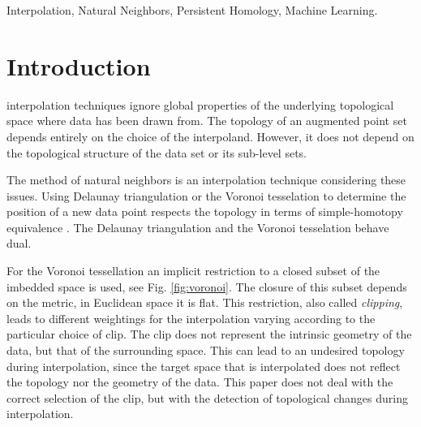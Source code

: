 \documentclass[journal]{IEEEtran}
\begin{document}
\begin{IEEEkeywords}
Interpolation, Natural Neighbors, Persistent Homology, Machine Learning.
\end{IEEEkeywords}


%
\IEEEpeerreviewmaketitle



\section{Introduction}
%
%
%
%
 interpolation techniques ignore global properties of the underlying topological space where data has been drawn from. The topology of an augmented point set depends entirely on the choice of the interpoland. However, it does not depend on the topological structure of the data set or its sub-level sets.

The method of natural neighbors is an interpolation technique considering these issues. Using Delaunay triangulation or the Voronoi tesselation to determine the position of a new data point respects the topology in terms of simple-homotopy equivalence \cite{Sibson}. The Delaunay triangulation and the Voronoi tesselation behave dual.

For the Voronoi tessellation an implicit restriction to a closed subset of the imbedded space is used, see Fig. \ref{fig:voronoi}. The closure of this subset depends on the metric, in Euclidean space it is flat. This restriction, also called \textit{clipping}, leads to different weightings for the interpolation varying according to the particular choice of clip. The clip does not represent the intrinsic geometry of the data, but that of the surrounding space. This can lead to an undesired topology during interpolation, since the target space that is interpolated does not reflect the topology nor the geometry of the data. This paper does not deal with the correct selection of the clip, but with the detection of topological changes during interpolation.
\end{document}
